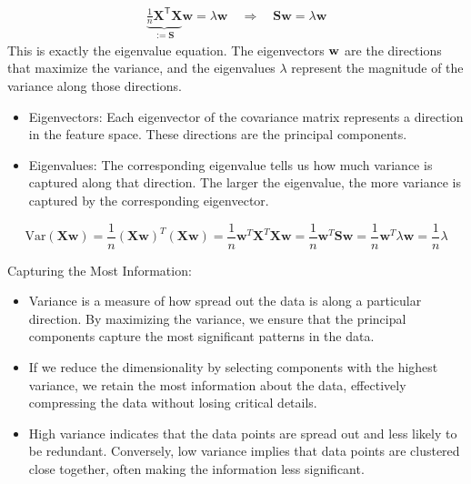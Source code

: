 \begin{align*}
	\underbrace{ \frac{1}{n} \mathbf{X}^\mathsf{T} \mathbf{X} }_{:= \mathbf{S} } \mathbf{w} = \lambda \mathbf{w}  \quad \Rightarrow \quad \mathbf{S} \mathbf{w} = \lambda \mathbf{w}
\end{align*}
This is exactly the eigenvalue equation. The eigenvectors ${\mathbf{w}}$ are the directions that maximize the variance, and the eigenvalues $\lambda$ represent the magnitude of the variance along those directions.

\begin{itemize}
	\item Eigenvectors: Each eigenvector of the covariance matrix represents a direction in the feature space. These directions are the principal components.
	\item Eigenvalues: The corresponding eigenvalue tells us how much variance is captured along that direction. The larger the eigenvalue, the more variance is captured by the corresponding eigenvector.
\end{itemize}

\[
\text{Var}(\mathbf{X}\mathbf{w}) = \frac{1}{n} (\mathbf{X}\mathbf{w})^T (\mathbf{X}\mathbf{w}) = \frac{1}{n} \mathbf{w}^T \mathbf{X}^T \mathbf{X} \mathbf{w} = \frac{1}{n} \mathbf{w}^T \mathbf{S} \mathbf{w} = \frac{1}{n} \mathbf{w}^T \lambda \mathbf{w} = \frac{1}{n} \lambda
\]

Capturing the Most Information:

\begin{itemize}
	\item Variance is a measure of how spread out the data is along a particular direction. By maximizing the variance, we ensure that the principal components capture the most significant patterns in the data.
	\item If we reduce the dimensionality by selecting components with the highest variance, we retain the most information about the data, effectively compressing the data without losing critical details.
	\item High variance indicates that the data points are spread out and less likely to be redundant. Conversely, low variance implies that data points are clustered close together, often making the information less significant.
\end{itemize}



